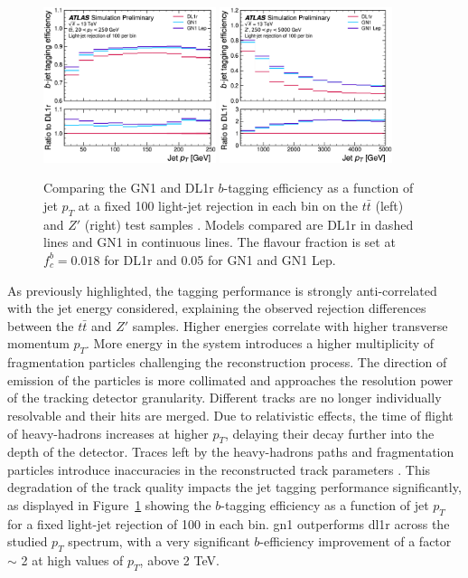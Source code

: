 \begin{figure}[h!]
  \centering
  \includegraphics[width=0.45\textwidth]{Images/FTAG/GN/GN1/eff/ptttb.png}
  \includegraphics[width=0.45\textwidth]{Images/FTAG/GN/GN1/eff/ptzpb.png}
  \caption{Comparing the GN1 and DL1r $b$-tagging efficiency as a function of jet $p_T$ at a fixed 100 light-jet rejection in each bin on the $t\bar{t}$ (left) and $Z'$ (right) test samples \cite{ATL-PHYS-PUB-2022-027}. Models compared are DL1r in dashed lines and GN1 in continuous lines. The flavour fraction is set at $f^b_c = 0.018$ for DL1r and 0.05 for GN1 and GN1 Lep.}
  \label{fig:GN1ptb}
\end{figure} 

As previously highlighted, the tagging performance is strongly anti-correlated with the jet energy considered, explaining the observed rejection differences between the $t\bar{t}$ and $Z'$ samples. Higher energies correlate with higher transverse momentum $p_T$. More energy in the system introduces a higher multiplicity of fragmentation particles challenging the reconstruction process. The direction of emission of the particles is more collimated and approaches the resolution power of the tracking detector granularity. Different tracks are no longer individually resolvable and their hits are merged. Due to relativistic effects, the time of flight of heavy-hadrons increases at higher $p_T$, delaying their decay further into the depth of the detector. Traces left by the heavy-hadrons paths and fragmentation particles introduce inaccuracies in the reconstructed track parameters \cite{ATLAS-tracks-algo}. This degradation of the track quality impacts the jet tagging performance significantly, as displayed in Figure~\ref{fig:GN1ptb} showing the $b$-tagging efficiency as a function of jet $p_T$ for a fixed light-jet rejection of 100 in each bin. \gls{gn1} outperforms \gls{dl1r} across the studied $p_T$ spectrum, with a very significant $b$-efficiency improvement of a factor $\sim$ 2 at high values of $p_T$, above 2 TeV. \\

